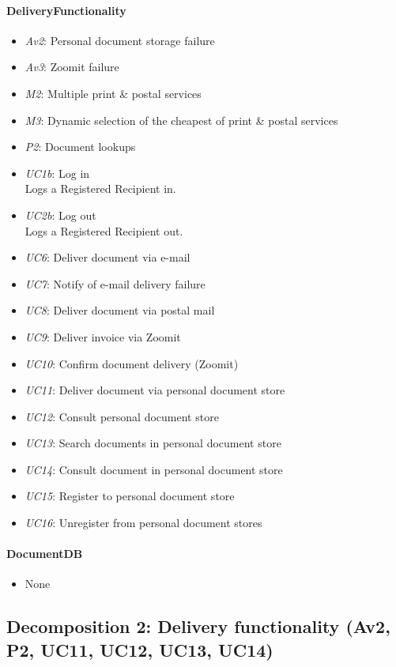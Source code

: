 \documentclass[a4paper,10pt]{article}
\begin{document}
\paragraph{DeliveryFunctionality}
\begin{itemize}
	\item \emph{Av2}: Personal document storage failure
	\item \emph{Av3}: Zoomit failure
	\item \emph{M2}: Multiple print \& postal services
	\item \emph{M3}: Dynamic selection of the cheapest of print \& postal services
	\item \emph{P2}: Document lookups
	\item \emph{UC1b}: Log in\\ Logs a Registered Recipient in.
    \item \emph{UC2b}: Log out\\ Logs a Registered Recipient out.
	\item \emph{UC6}: Deliver document via e-mail
 	\item \emph{UC7}: Notify of e-mail delivery failure
 	\item \emph{UC8}: Deliver document via postal mail
 	\item \emph{UC9}: Deliver invoice via Zoomit
 	\item \emph{UC10}: Confirm document delivery (Zoomit)
	\item \emph{UC11}: Deliver document via personal document store
	\item \emph{UC12}: Consult personal document store
	\item \emph{UC13}: Search documents in personal document store
	\item \emph{UC14}: Consult document  in personal document store
	\item \emph{UC15}: Register to personal document store
	\item \emph{UC16}: Unregister from personal document stores
\end{itemize}
\paragraph{DocumentDB}
\begin{itemize}
	\item None
\end{itemize}



\subsection{Decomposition 2: Delivery functionality (Av2, P2, UC11, UC12, UC13, UC14)}
\end{document}
